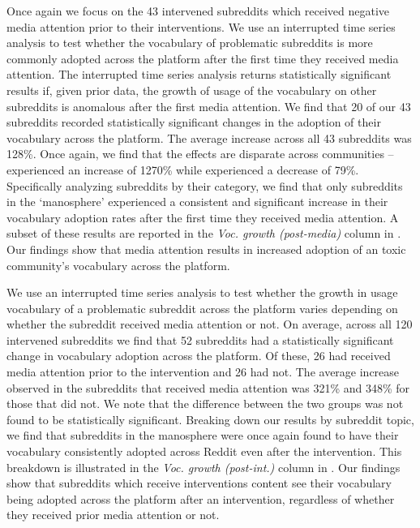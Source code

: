  Once again we 
focus on the 43 intervened subreddits which received negative media attention
prior to their interventions. We use an interrupted time series analysis to
test whether the vocabulary of problematic subreddits is more commonly adopted
across the platform after the first time they received media attention. The
interrupted time series analysis returns statistically significant results if,
given prior data, the growth of usage of the vocabulary on other subreddits is
anomalous after the first media attention. We find that 20 of our 43 subreddits
recorded statistically significant changes in the adoption of their
vocabulary across the platform. The average increase across all 43 subreddits
was 128\%. Once again, we find that the effects are disparate across
communities -- \eg {} experienced an increase of 1270\%
while  experienced a decrease of 79\%. Specifically
analyzing subreddits by their category, we find that only subreddits in the
`manosphere' experienced a consistent and significant increase in their
vocabulary adoption rates after the first time they received media attention.
A subset of these results are reported in the \emph{Voc. growth (post-media)}
column in . Our findings show that
media attention results in increased adoption of an toxic
community's vocabulary across the platform.


 We use an interrupted time series
analysis to test whether the growth in usage vocabulary of a problematic
subreddit across the platform varies depending on whether the subreddit
received media attention or not. On average, across all 120 intervened
subreddits we find that 52 subreddits had a statistically significant change in
vocabulary adoption across the platform. Of these, 26 had received media
attention prior to the intervention and 26 had not. The average increase
observed in the subreddits that received media attention was 321\% and
348\% for those that did not. We note that the difference between the two
groups was not found to be statistically significant. Breaking down our results
by subreddit topic, we find that subreddits in the manosphere were once again
found to have their vocabulary consistently adopted across Reddit even after
the intervention. This breakdown is illustrated in the \emph{Voc. growth
(post-int.)} column in . Our findings show
that subreddits which receive interventions content see their
vocabulary being adopted across the platform after an intervention, regardless
of whether they received prior media attention or not. 


